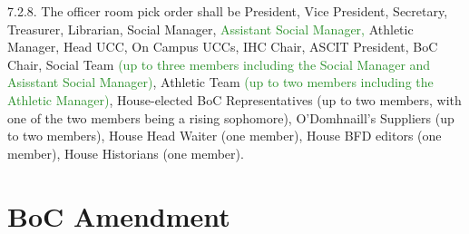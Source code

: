 \documentclass[10pt]{article} %
\begin{document}
\begin{itemize}
	7.2.8. The officer room pick order shall be President, Vice President, Secretary, Treasurer, Librarian, Social Manager, \textcolor{ForestGreen}{Assistant Social Manager,} Athletic Manager, Head UCC, On Campus UCCs, IHC Chair, ASCIT President, BoC Chair, Social Team \textcolor{ForestGreen}{(up to three members including the Social Manager and Asisstant Social Manager)}, Athletic Team \textcolor{ForestGreen}{(up to two members including the Athletic Manager)}, House-elected BoC Representatives (up to two members, with one of the two members being a rising sophomore), O’Domhnaill’s Suppliers (up to two members), House Head Waiter (one member), House BFD editors (one member), House Historians (one member).
\end{itemize}

\section{BoC Amendment}
\end{document}

